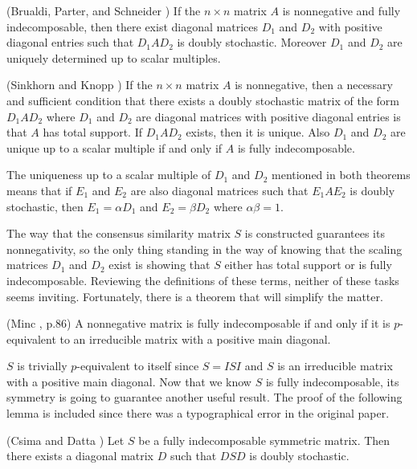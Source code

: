 \documentclass[final]{siamltex}
\begin{document}
\begin{theorem} \label{th:bps}
(Brualdi, Parter, and Schneider \cite{brualdi1966den}) If the $n \times n$ matrix $A$ is nonnegative and fully indecomposable, then there exist diagonal matrices $D_{1}$ and $D_{2}$ with positive diagonal entries such that $D_{1}AD_{2}$ is doubly stochastic. Moreover $D_{1}$ and $D_{2}$ are uniquely determined up to scalar multiples.
\end{theorem}

\begin{theorem} \label{th:sk}
(Sinkhorn and Knopp \cite{sk}) If the $n \times n$ matrix $A$ is nonnegative, then a necessary and sufficient condition that there exists a doubly stochastic matrix of the form $D_{1}AD_{2}$ where $D_{1}$ and $D_{2}$ are diagonal matrices with positive diagonal entries is that $A$ has total support. If $D_{1}AD_{2}$ exists, then it is unique. Also $D_{1}$ and $D_{2}$ are unique up to a scalar multiple if and only if $A$ is fully indecomposable.
\end{theorem}

The uniqueness up to a scalar multiple of $D_{1}$ and $D_{2}$ mentioned in both theorems means that if $E_{1}$ and $E_{2}$ are also diagonal matrices such that  $E_{1}AE_{2}$ is doubly stochastic, then $E_{1}=\alpha D_{1}$ and  $E_{2}=\beta D_{2}$ where $\alpha\beta=1$.

The way that the consensus similarity matrix $S$ is constructed guarantees its nonnegativity, so the only thing standing in the way of knowing that the scaling matrices $D_{1}$ and $D_{2}$ exist is showing that $S$ either has total support or is fully indecomposable. Reviewing the definitions of these terms, neither of these tasks seems inviting. Fortunately, there is a theorem that will simplify the matter.

\begin{theorem} \label{Minc}
(Minc \cite{minc1988nm}, p.86) A nonnegative matrix is fully indecomposable if and only if it is $p$-equivalent to an irreducible matrix with a positive main diagonal.
\end{theorem}

$S$ is trivially $p$-equivalent to itself since $S=ISI$ and $S$ is an irreducible matrix with a positive main diagonal. Now that we know $S$ is fully indecomposable, its symmetry is going to guarantee another useful result. The proof of the following lemma is included since there was a typographical error in the original paper. 

\begin{lemma} \label{Csima}
(Csima and Datta \cite{csima1972dts}) Let $S$ be a fully indecomposable symmetric matrix. Then there exists a diagonal matrix $D$ such that $DSD$ is doubly stochastic.
\end{lemma}
\end{document}
